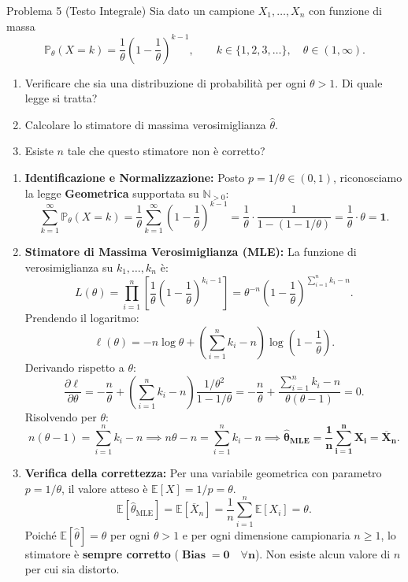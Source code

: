 \documentclass[11pt,a4paper]{article}
\newcommand{\EE}{\mathbb{E}}
\newcommand{\Prob}{\mathbb{P}}
\begin{document}
\begin{problemabox}{Problema 5 (Testo Integrale)}
Sia dato un campione $X_1,\dots,X_n$ con funzione di massa
\[
\Prob_\theta(X = k) = \frac{1}{\theta}\left(1 - \frac{1}{\theta}\right)^{k-1}, \qquad k \in \{1, 2, 3, \dots\}, \quad \theta \in (1, \infty).
\]
\begin{enumerate}[label=(\alph*)]
    \item Verificare che sia una distribuzione di probabilità per ogni $\theta > 1$. Di quale legge si tratta?
    \item Calcolare lo stimatore di massima verosimiglianza $\widehat{\theta}$.
    \item Esiste $n$ tale che questo stimatore non è corretto?
\end{enumerate}
\end{problemabox}

\begin{soluzionebox}
\begin{enumerate}[label=(\alph*)]
    \item \textbf{Identificazione e Normalizzazione:}
    Posto $p = 1/\theta \in (0, 1)$, riconosciamo la legge \textbf{Geometrica} supportata su $\mathbb{N}_{>0}$:
    \[
    \sum_{k=1}^\infty \Prob_\theta(X=k) = \frac{1}{\theta} \sum_{k=1}^\infty \left(1 - \frac{1}{\theta}\right)^{k-1} = \frac{1}{\theta} \cdot \frac{1}{1 - (1 - 1/\theta)} = \frac{1}{\theta} \cdot \theta = \mathbf{1}.
    \]

    \item \textbf{Stimatore di Massima Verosimiglianza (MLE):}
    La funzione di verosimiglianza su $k_1, \dots, k_n$ è:
    \[
    L(\theta) = \prod_{i=1}^n \left[ \frac{1}{\theta}\left(1 - \frac{1}{\theta}\right)^{k_i - 1} \right] = \theta^{-n} \left(1 - \frac{1}{\theta}\right)^{\sum_{i=1}^n k_i - n}.
    \]
    Prendendo il logaritmo:
    \[
    \ell(\theta) = -n \log \theta + \left(\sum_{i=1}^n k_i - n\right) \log\left(1 - \frac{1}{\theta}\right).
    \]
    Derivando rispetto a $\theta$:
    \[
    \frac{\partial \ell}{\partial \theta} = -\frac{n}{\theta} + \left(\sum_{i=1}^n k_i - n\right) \frac{1/\theta^2}{1 - 1/\theta} = -\frac{n}{\theta} + \frac{\sum_{i=1}^n k_i - n}{\theta(\theta - 1)} = 0.
    \]
    Risolvendo per $\theta$:
    \[
    n(\theta - 1) = \sum_{i=1}^n k_i - n \implies n\theta - n = \sum_{i=1}^n k_i - n \implies \mathbf{\widehat{\theta}_{\text{MLE}} = \frac{1}{n}\sum_{i=1}^n X_i = \overline{X}_n}.
    \]

    \item \textbf{Verifica della correttezza:}
    Per una variabile geometrica con parametro $p = 1/\theta$, il valore atteso è $\EE[X] = 1/p = \theta$.
    \[
    \EE[\widehat{\theta}_{\text{MLE}}] = \EE[\overline{X}_n] = \frac{1}{n}\sum_{i=1}^n \EE[X_i] = \theta.
    \]
    Poiché $\EE[\widehat{\theta}] = \theta$ per ogni $\theta > 1$ e per ogni dimensione campionaria $n \ge 1$, lo stimatore è \textbf{sempre corretto} ($\mathbf{\operatorname{Bias} = 0 \quad \forall n}$). Non esiste alcun valore di $n$ per cui sia distorto.
\end{enumerate}
\end{soluzionebox}
\end{document}
